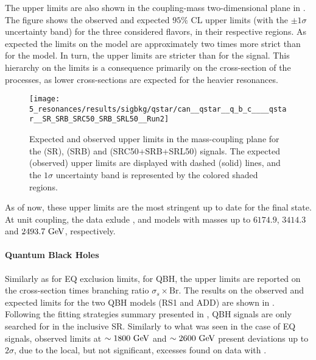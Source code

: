 The upper limits are also shown in the coupling-mass two-dimensional plane in \Fig{\ref{fig:results:results:bkgsig:results:qstar:limits_2d}}. The figure shows the observed and expected \(95\%\) \ac{CL} upper limits (with the \(\pm 1 \sigma\) uncertainty band) for the three considered flavors, in their respective regions. As expected the limits on the \qstar model are approximately two times more strict than for the \cstar model. In turn, the \cstar upper limits are stricter than for the \bstar signal. This hierarchy on the limits is a consequence primarily on the cross-section of the processes, as lower cross-sections are expected for the heavier resonances. 

\begin{figure}[ht!]
    \centering
    \texttt{[image: 5\_resonances/results/sigbkg/qstar/can\_\_qstar\_\_q\_b\_c\_\_\_\_qstar\_\_SR\_SRB\_SRC50\_SRB\_SRL50\_\_Run2]}
    \caption{Expected and observed upper limits in the mass-coupling plane for the \qstar (SR), \bstar (SRB) and \cstar (SRC50+SRB+SRL50) signals. The expected (observed) upper limits are displayed with dashed (solid) lines, and the \(1\sigma\) uncertainty band is represented by the colored shaded regions.}
    \label{fig:results:results:bkgsig:results:qstar:limits_2d}
\end{figure}


As of now, these upper limits are the most stringent up to date for the \gammajet final state. At unit coupling, the data exlude \qstar, \cstar and \bstar models with masses up to \(6174.9\), \(3414.3\) and \(2493.7~\text{GeV}\), respectively.



\paragraph{Quantum Black Holes}
\label{paragraph:results:results:bkgsig:results:qbh}

Similarly as for \ac{EQ} exclusion limits, for \ac{QBH}, the upper limits are reported on the cross-section times branching ratio \(\sigma_s \times \text{Br}\).
The results on the observed and expected limits for the two \ac{QBH} models (RS1 and ADD) are shown in \Fig{\ref{fig:results:results:bkgsig:results:qbh:limits}}. Following the fitting strategies summary presented in \Tab{\ref{tab:bkg:modeling:strategy_modeling:summary}}, \ac{QBH} signals are only searched for in the inclusive SR. Similarly to what was seen in the case of \ac{EQ} signals, observed limits at \(\sim 1800~\text{GeV}\) and \(\sim 2600~\text{GeV}\) present deviations up to \(2\sigma\), due to the local, but not significant, excesses found on data with \bh.

